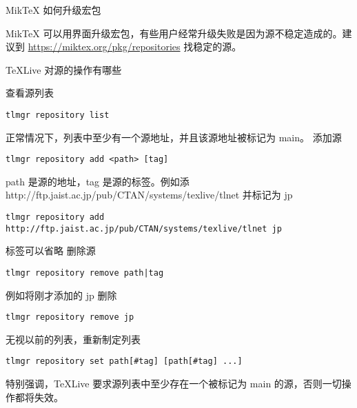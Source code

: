 \begin{faq}{MikTeX 如何升级宏包}

MikTeX
可以用界面升级宏包，有些用户经常升级失败是因为源不稳定造成的。建议到
\url{https://miktex.org/pkg/repositories} 找稳定的源。
\end{faq}


\begin{faq}{\TeX Live 对源的操作有哪些}

查看源列表
\begin{verbatim}
tlmgr repository list
\end{verbatim}

正常情况下，列表中至少有一个源地址，并且该源地址被标记为 main。 添加源
\begin{verbatim}
tlmgr repository add <path> [tag]
\end{verbatim}

path 是源的地址，tag 是源的标签。例如添
http://ftp.jaist.ac.jp/pub/CTAN/systems/texlive/tlnet 并标记为 jp
\begin{verbatim}
tlmgr repository add http://ftp.jaist.ac.jp/pub/CTAN/systems/texlive/tlnet jp
\end{verbatim}

标签可以省略 删除源
\begin{verbatim}
tlmgr repository remove path|tag
\end{verbatim}

例如将刚才添加的 jp 删除
\begin{verbatim}
tlmgr repository remove jp
\end{verbatim}

无视以前的列表，重新制定列表
\begin{verbatim}
tlmgr repository set path[#tag] [path[#tag] ...]
\end{verbatim}

特别强调，TeXLive 要求源列表中至少存在一个被标记为 main
的源，否则一切操作都将失效。
\end{faq}


